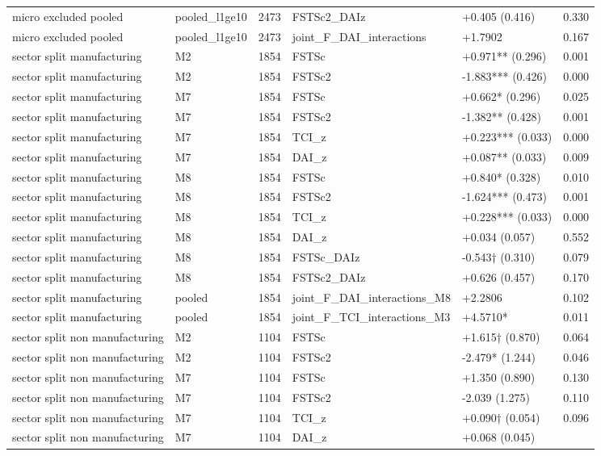 \documentclass[12pt,a4paper]{article}
\begin{document}
\begin{longtable}[]{@{}llllll@{}}
micro excluded pooled & pooled\_l1ge10 & 2473 & FSTSc2\_DAIz & +0.405
(0.416) & 0.330 \\
micro excluded pooled & pooled\_l1ge10 & 2473 &
joint\_F\_DAI\_interactions & +1.7902 & 0.167 \\
sector split manufacturing & M2 & 1854 & FSTSc & +0.971** (0.296) &
0.001 \\
sector split manufacturing & M2 & 1854 & FSTSc2 & -1.883*** (0.426) &
0.000 \\
sector split manufacturing & M7 & 1854 & FSTSc & +0.662* (0.296) &
0.025 \\
sector split manufacturing & M7 & 1854 & FSTSc2 & -1.382** (0.428) &
0.001 \\
sector split manufacturing & M7 & 1854 & TCI\_z & +0.223*** (0.033) &
0.000 \\
sector split manufacturing & M7 & 1854 & DAI\_z & +0.087** (0.033) &
0.009 \\
sector split manufacturing & M8 & 1854 & FSTSc & +0.840* (0.328) &
0.010 \\
sector split manufacturing & M8 & 1854 & FSTSc2 & -1.624*** (0.473) &
0.001 \\
sector split manufacturing & M8 & 1854 & TCI\_z & +0.228*** (0.033) &
0.000 \\
sector split manufacturing & M8 & 1854 & DAI\_z & +0.034 (0.057) &
0.552 \\
sector split manufacturing & M8 & 1854 & FSTSc\_DAIz & -0.543† (0.310) &
0.079 \\
sector split manufacturing & M8 & 1854 & FSTSc2\_DAIz & +0.626 (0.457) &
0.170 \\
sector split manufacturing & pooled & 1854 &
joint\_F\_DAI\_interactions\_M8 & +2.2806 & 0.102 \\
sector split manufacturing & pooled & 1854 &
joint\_F\_TCI\_interactions\_M3 & +4.5710* & 0.011 \\
sector split non manufacturing & M2 & 1104 & FSTSc & +1.615† (0.870) &
0.064 \\
sector split non manufacturing & M2 & 1104 & FSTSc2 & -2.479* (1.244) &
0.046 \\
sector split non manufacturing & M7 & 1104 & FSTSc & +1.350 (0.890) &
0.130 \\
sector split non manufacturing & M7 & 1104 & FSTSc2 & -2.039 (1.275) &
0.110 \\
sector split non manufacturing & M7 & 1104 & TCI\_z & +0.090† (0.054) &
0.096 \\
sector split non manufacturing & M7 & 1104 & DAI\_z & +0.068 (0.045) &

\end{longtable}
\end{document}
